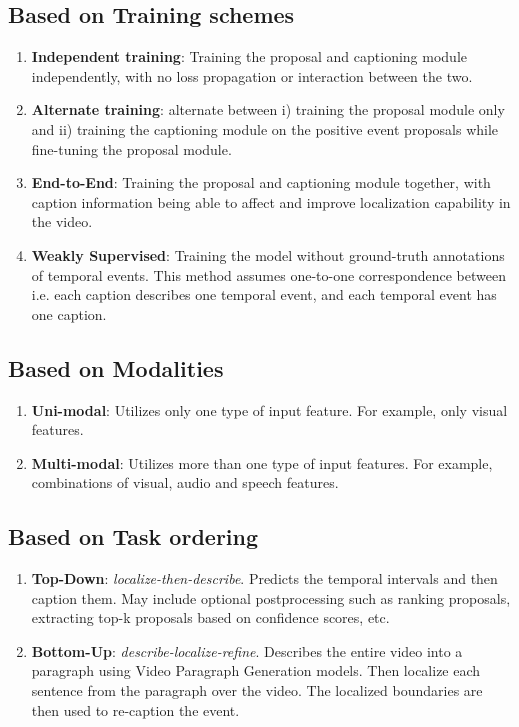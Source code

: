 \subsection{Based on Training schemes}
\begin{enumerate}
	\item \textbf{Independent training}: Training the proposal and captioning module independently, with no loss propagation or interaction between the two.
	\item \textbf{Alternate training}: alternate between i) training the proposal module only and ii) training the captioning module on the positive event proposals while fine-tuning the proposal module.
	\item \textbf{End-to-End}: Training the proposal and captioning module together, with caption information being able to affect and improve localization capability in the video.
	\item \textbf{Weakly Supervised}: Training the model without ground-truth annotations of temporal events. This method assumes one-to-one correspondence between i.e. each caption describes one temporal event, and each temporal event has one caption.
\end{enumerate}

\subsection{Based on Modalities}
\begin{enumerate}
	\item \textbf{Uni-modal}: Utilizes only one type of input feature. For example, only visual features.
	\item \textbf{Multi-modal}: Utilizes more than one type of input features. For example, combinations of visual, audio and speech features.
\end{enumerate}

\subsection{Based on Task ordering}
\begin{enumerate}
	\item \textbf{Top-Down}: \textit{localize-then-describe}. Predicts the temporal intervals and then caption them. May include optional postprocessing such as ranking proposals, extracting top-k proposals based on confidence scores, etc.
	\item \textbf{Bottom-Up}: \textit{describe-localize-refine}. Describes the entire video into a paragraph using Video Paragraph Generation models. Then localize each sentence from the paragraph over the video. The localized boundaries are then used to re-caption the event.
\end{enumerate}

